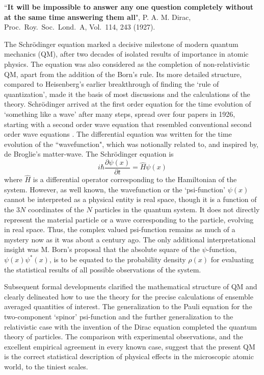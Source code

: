 ``\textbf{It will be impossible to answer any one question completely without at the
same time answering them all}", P. A. M. Dirac, Proc.\ Roy.\ Soc.\ Lond.\ A, Vol.\ 114,
243 (1927).

The Schr\"{o}dinger equation marked a decisive milestone of modern quantum mechanics
(QM), after two decades of isolated results of importance in atomic physics. The equation
was also considered as the completion of non-relativistic QM, apart from the addition of the
Born's rule. Its more detailed structure, compared to Heisenberg's earlier breakthrough of
finding the `rule of quantization', made it the basis of most discussions and the calculations
of the theory. Schr\"{o}dinger arrived at the first order equation for the time evolution of
`something like a wave' after many steps, spread over four papers in 1926, starting with a
second order wave equation that resembled conventional second order wave equations \cite{chap14-key1}.
The differential equation was written for the time evolution of the ``wavefunction", which was
notionally related to, and inspired by, de Broglie's matter-wave. The Schr\"{o}dinger equation
is
\begin{equation*}
i \hbar \frac{\partial \psi (x)}{\partial t} = \hat{H} \psi (x) \tag{1}\label{c14-eq1}
\end{equation*}
where $\hat{H}$ is a differential operator corresponding to the Hamiltonian of the system. However,
as well known, the wavefunction or the `psi-function' $\psi (x)$ cannot be interpreted as a physical
entity is real space, though it is a function of the $3N$ coordinates of the $N$ particles in the
quantum system. It does not directly represent the material particle or a wave corresponding
to the particle, evolving in real space. Thus, the complex valued psi-function remains as
much of a mystery now as it was about a century ago. The only additional interpretational
insight was M. Born's proposal that the absolute square of the $\psi$-function, $\psi(x) \psi^{\ast}(x)$, is to
be equated to the probability density $\rho(x)$ for evaluating the statistical results of all possible
observations of the system.

Subsequent formal developments clarified the mathematical structure of QM and clearly
delineated how to use the theory for the precise calculations of ensemble averaged quantities
of interest. The generalization to the Pauli equation for the two-component `spinor' psi-function and the further generalization to the relativistic case with the invention of the Dirac
equation completed the quantum theory of particles. The comparison with experimental
observations, and the excellent empirical agreement in every known case, suggest that the
present QM is the correct statistical description of physical effects in the microscopic atomic
world, to the tiniest scales.

